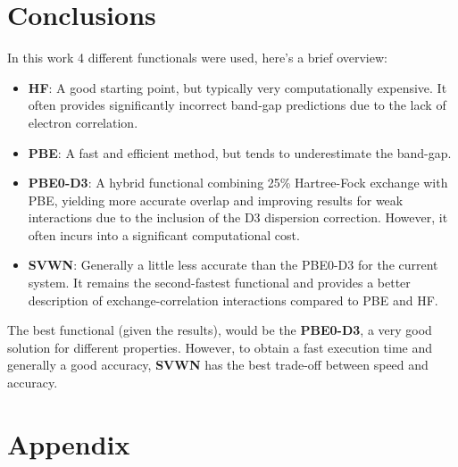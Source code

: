 \documentclass{article}
\begin{document}
\newpage
\section{Conclusions}
In this work 4 different functionals were used, here's a brief overview:
\begin{itemize}
	\item \textbf{HF}: A good starting point, but typically very computationally expensive. It often provides significantly incorrect band-gap predictions due to the lack of electron correlation.
	\item \textbf{PBE}: A fast and efficient method, but tends to underestimate the band-gap.
	\item \textbf{PBE0-D3}: A hybrid functional combining 25\% Hartree-Fock exchange with PBE, yielding more accurate overlap and improving results for weak interactions due to the inclusion of the D3 dispersion correction. However, it often incurs into a significant computational cost.
	\item \textbf{SVWN}: Generally a little less accurate than the PBE0-D3 for the current system. It remains the second-fastest functional and provides a better description of exchange-correlation interactions compared to PBE and HF.
\end{itemize}

\noindent The best functional (given the results), would be the \textbf{PBE0-D3}, a very good solution for different properties. However, to obtain a fast execution time and generally a good accuracy, \textbf{SVWN} has the best trade-off between speed and accuracy.

\section{Appendix}
\end{document}
